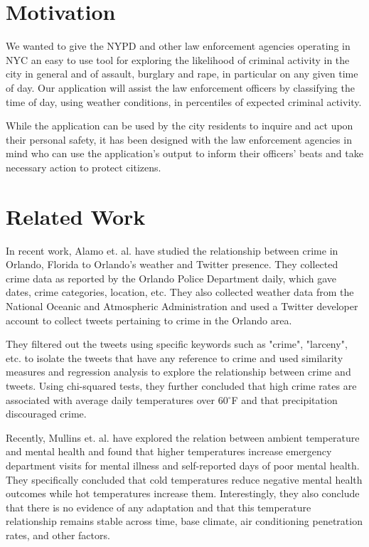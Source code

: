\documentclass[conference]{IEEEtran}
\begin{document}
\section{Motivation}
We wanted to give the NYPD and other law enforcement agencies operating in NYC an easy to use tool for exploring the likelihood of criminal activity in the city in general and of assault, burglary and rape, in particular on any given time of day. 
Our application will assist the law enforcement officers by classifying the time of day, using weather conditions, in percentiles of expected criminal activity. 

While the application can be used by the city residents to inquire and act upon their personal safety, it has been designed with the law enforcement agencies in mind who can use the application’s output to inform their officers’ beats and take necessary action to protect citizens.

\section{Related Work}
In recent work, Alamo et. al. \cite{b1} have studied the relationship between crime in Orlando, Florida to Orlando's weather and Twitter presence.
They collected crime data as reported by the Orlando Police Department daily, which gave dates, crime categories, location, etc.
They also collected weather data from the National Oceanic and Atmospheric Administration and used a Twitter developer account to collect tweets pertaining to crime in the Orlando area.

They filtered out the tweets using specific keywords such as "crime", "larceny", etc. to isolate the tweets that have any reference to crime and used similarity measures and regression analysis to explore the relationship between crime and tweets.
Using chi-squared tests, they further concluded that high crime rates are associated with average daily temperatures over 60$^{\circ}$F and that precipitation discouraged crime.

Recently, Mullins et. al. \cite{b2} have explored the relation between ambient temperature and mental health and found that higher temperatures increase emergency department visits for mental illness and self-reported days of poor mental health.
They specifically concluded that cold temperatures reduce negative mental health outcomes while hot temperatures increase them.
Interestingly, they also conclude that there is no evidence of any adaptation and that this temperature relationship remains stable across time, base climate, air conditioning penetration rates, and other factors.
\end{document}
